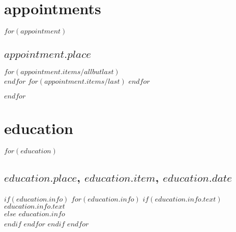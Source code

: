 \documentclass[11pt, a4paper]{article}
\title{}
\begin{document}
\maketitle




\section{appointments}
%
$for(appointment)$
\subsection{\textbf{$appointment.place$}}
\begin{separator}
  $for(appointment.items/allbutlast)$
    \\
    \vspace{.5em}
  $endfor$
  $for(appointment.items/last)$
  $endfor$
\end{separator}
$endfor$

\section{education}
$for(education)$
\subsection{$education.place$, $education.item$, $education.date$}
$if(education.info)$
$for(education.info)$
$if(education.info.text)$
$education.info.text$ \\
$else$
$education.info$ \\
$endif$
$endfor$
$endif$
$endfor$

\end{document}
